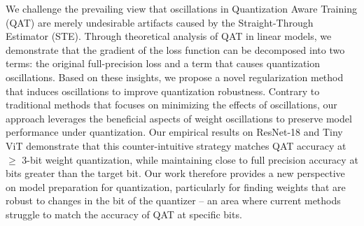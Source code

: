 We challenge the prevailing view that oscillations in Quantization Aware Training (QAT) are merely undesirable artifacts caused by the Straight-Through Estimator (STE). Through theoretical analysis of QAT in linear models, we demonstrate that the gradient of the loss function can be decomposed into two terms: the original full-precision loss and a term that causes quantization oscillations. Based on these insights, we propose a novel regularization method that induces oscillations to improve quantization robustness. Contrary to traditional methods that focuses on minimizing the effects of oscillations, our approach leverages the beneficial aspects of weight oscillations to preserve model performance under quantization. Our empirical results on ResNet-18 and Tiny ViT demonstrate that this counter-intuitive strategy matches QAT accuracy at $\geq$ 3-bit weight quantization, while maintaining close to full precision accuracy at bits greater than the target bit. Our work therefore provides a new perspective on model preparation for quantization, particularly for finding weights that are robust to changes in the bit of the quantizer -- an area where current methods struggle to match the accuracy of QAT at specific bits.